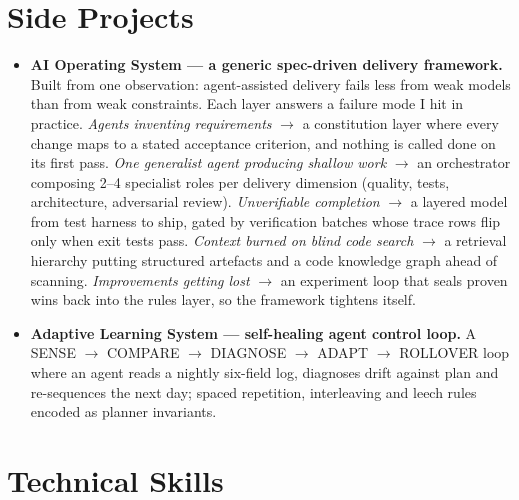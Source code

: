 \documentclass[a4paper,10pt]{article}
\begin{document}
\section*{Side Projects}

\begin{itemize}
  \item \textbf{AI Operating System --- a generic spec-driven delivery framework.} Built from one observation: agent-assisted delivery fails less from weak models than from weak constraints. Each layer answers a failure mode I hit in practice. \textit{Agents inventing requirements} $\rightarrow$ a constitution layer where every change maps to a stated acceptance criterion, and nothing is called done on its first pass. \textit{One generalist agent producing shallow work} $\rightarrow$ an orchestrator composing 2--4 specialist roles per delivery dimension (quality, tests, architecture, adversarial review). \textit{Unverifiable completion} $\rightarrow$ a layered model from test harness to ship, gated by verification batches whose trace rows flip only when exit tests pass. \textit{Context burned on blind code search} $\rightarrow$ a retrieval hierarchy putting structured artefacts and a code knowledge graph ahead of scanning. \textit{Improvements getting lost} $\rightarrow$ an experiment loop that seals proven wins back into the rules layer, so the framework tightens itself.
  \item \textbf{Adaptive Learning System --- self-healing agent control loop.} A SENSE $\rightarrow$ COMPARE $\rightarrow$ DIAGNOSE $\rightarrow$ ADAPT $\rightarrow$ ROLLOVER loop where an agent reads a nightly six-field log, diagnoses drift against plan and re-sequences the next day; spaced repetition, interleaving and leech rules encoded as planner invariants.
\end{itemize}

\section*{Technical Skills}
\end{document}
